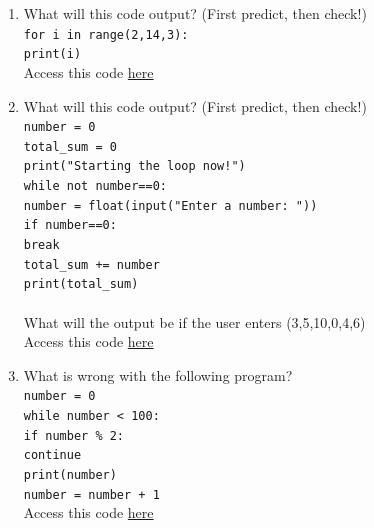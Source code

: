\documentclass{article}
\begin{document}
\begin{enumerate}
	\item What will this code output? (First predict, then check!)\\ \texttt{for i in range(2,14,3):}\\
	\null\quad\texttt{print(i)}\\
	Access this code \href{https://drive.google.com/file/d/1Vgx3xMf-leakZH7JsuG3AWKbhZk_M-Iz/view?usp=sharing}{here}
	\item What will this code output? (First predict, then check!)\\
	\texttt{number = 0}\\
	\texttt{total\_sum = 0}\\
	\texttt{print("Starting the loop now!")}\\
	\texttt{while not number==0:}\\
	\null\quad\texttt{number = float(input("Enter a number: "))}\\
	\null\quad\texttt{if number==0:}\\
	\null\quad\quad\texttt{break}\\
	\null\quad\texttt{total\_sum += number}\\
	\texttt{print(total\_sum)}\\
	\\
	What will the output be if the user enters (3,5,10,0,4,6)
	\\ Access this code \href{https://drive.google.com/file/d/1xVFPgdcBwbSfDffBRs6MCMa71H9JUnLz/view?usp=sharing}{here}
	
	\item What is wrong with the following program?\\ \texttt{number = 0}\\
	\texttt{while number < 100:}\\
	\null\quad\texttt{if number \% 2:}\\
		\null\quad\quad\texttt{continue}\\
		\null\quad\texttt{print(number)}\\
		\null\quad\texttt{number = number + 1}\\
	Access this code \href{https://drive.google.com/file/d/1jHL78CYhemlJ3s4m5qehKsSCfctY9zag/view?usp=sharing}{here}
		

\end{enumerate}
\end{document}

